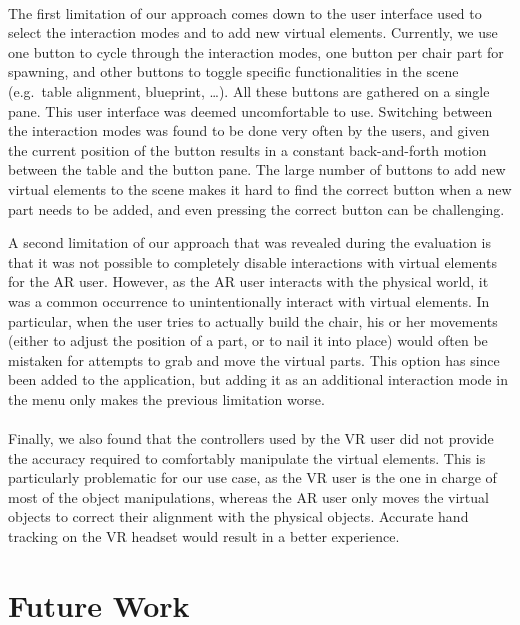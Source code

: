 \documentclass[10pt,twocolumn,letterpaper,english]{article}
\begin{document}
\paragraph{}

The first limitation of our approach comes down to the user interface used to select the interaction modes and to add new virtual elements. Currently, we use one button to cycle through the interaction modes, one button per chair part for spawning, and other buttons to toggle specific functionalities in the scene (e.g.\ table alignment, blueprint, \dots). All these buttons are gathered on a single pane. This user interface was deemed uncomfortable to use. Switching between the interaction modes was found to be done very often by the users, and given the current position of the button results in a constant back-and-forth motion between the table and the button pane. The large number of buttons to add new virtual elements to the scene makes it hard to find the correct button when a new part needs to be added, and even pressing the correct button can be challenging.

A second limitation of our approach that was revealed during the evaluation is that it was not possible to completely disable interactions with virtual elements for the AR user. However, as the AR user interacts with the physical world, it was a common occurrence to unintentionally interact with virtual elements. In particular, when the user tries to actually build the chair, his or her movements (either to adjust the position of a part, or to nail it into place) would often be mistaken for attempts to grab and move the virtual parts. This option has since been added to the application, but adding it as an additional interaction mode in the menu only makes the previous limitation worse.

\paragraph{}
Finally, we also found that the controllers used by the VR user did not provide the accuracy required to comfortably manipulate the virtual elements. This is particularly problematic for our use case, as the VR user is the one in charge of most of the object manipulations, whereas the AR user only moves the virtual objects to correct their alignment with the physical objects. Accurate hand tracking on the VR headset would result in a better experience.

\section{Future Work}
\end{document}
